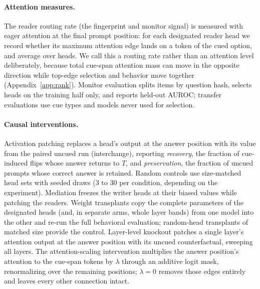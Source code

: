 \documentclass{article}
\begin{document}
\paragraph{Attention measures.} The reader routing rate (the fingerprint and monitor signal) is measured with eager attention at the final prompt position: for each designated reader head we record whether its maximum attention edge lands on a token of the cued option, and average over heads. We call this a routing rate rather than an attention level deliberately, because total cue-span attention mass can move in the opposite direction while top-edge selection and behavior move together (Appendix~\ref{app:rank}). Monitor evaluation splits items by question hash, selects heads on the training half only, and reports held-out AUROC; transfer evaluations use cue types and models never used for selection.

\paragraph{Causal interventions.} Activation patching replaces a head's output at the answer position with its value from the paired uncued run (interchange), reporting \emph{recovery}, the fraction of cue-induced flips whose answer returns to $T$, and \emph{preservation}, the fraction of uncued prompts whose correct answer is retained. Random controls use size-matched head sets with seeded draws (3 to 30 per condition, depending on the experiment). Mediation freezes the writer heads at their biased values while patching the readers. Weight transplants copy the complete parameters of the designated heads (and, in separate arms, whole layer bands) from one model into the other and re-run the full behavioral evaluation; random-head transplants of matched size provide the control. Layer-level knockout patches a single layer's attention output at the answer position with its uncued counterfactual, sweeping all layers. The attention-scaling intervention multiplies the answer position's attention to the cue-span tokens by $\lambda$ through an additive logit mask, renormalizing over the remaining positions; $\lambda{=}0$ removes those edges entirely and leaves every other connection intact.
\end{document}
